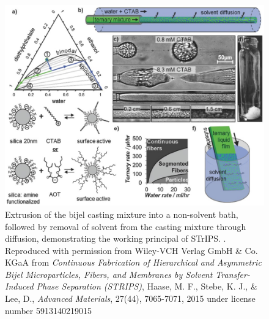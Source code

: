 \begin{figure}
    \centering
    \includegraphics[scale = 5]{figures/introduction/STrIPS.jpg}
    \caption{Extrusion of the bijel casting mixture into a non-solvent bath, followed by removal of solvent from 
             the casting mixture through diffusion, demonstrating the working principal of STrIPS. \cite{haase_continuous_2015}. Reproduced with permission from Wiley-VCH Verlag GmbH 
             \& Co. KGaA from \textit{Continuous Fabrication of Hierarchical and Asymmetric Bijel Microparticles, Fibers, and Membranes by 
             Solvent Transfer-Induced Phase Separation (STRIPS)}, Haase, M. F., Stebe, K. J., 
             \& Lee, D., \textit{Advanced Materials}, 27(44), 7065-7071, 2015 under license number 5913140219015}
    \label{fig:strips}
\end{figure}


